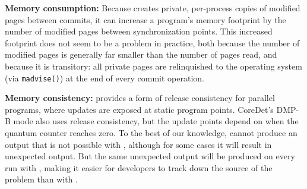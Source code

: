 

\textbf{Memory consumption: }
Because \dthreads{} creates private, per-process copies of modified pages between commits, it can increase a program's memory footprint by the number of modified pages between synchronization points. This increased footprint does not seem to be a problem in practice, both because the number of modified pages is generally far smaller than the number of pages read, and because it is transitory: all private pages are relinquished to the operating system (via \texttt{madvise()}) at the end of every commit operation.

\textbf{Memory consistency:} 
\dthreads{} provides a form of release consistency for parallel programs, where updates are exposed at static program points. 
CoreDet's DMP-B mode also uses release consistency, but the update points depend on when the quantum counter reaches zero.  To the best of our knowledge, \dthreads{} cannot produce an output that is not possible with \pthreads{}, although for some cases it will result in unexpected output.  But the same unexpected output will be produced on every run
with \dthreads{}, making it easier for developers to track down the source of the problem than with \pthreads{}.

